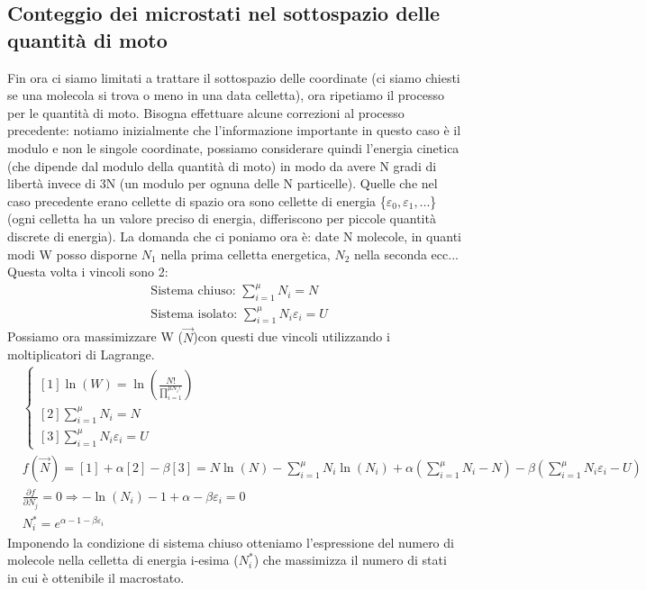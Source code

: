 \documentclass[
10pt, %
a4paper, %
oneside, %
headinclude,footinclude, %
BCOR5mm, %
]{scrartcl}
\begin{document}
\subsection{Conteggio dei microstati nel sottospazio delle quantità di moto}
Fin ora ci siamo limitati a trattare il sottospazio delle coordinate (ci siamo chiesti se una molecola si trova o meno in una data celletta), ora ripetiamo il processo per le quantità di moto. Bisogna effettuare alcune correzioni al processo precedente: notiamo inizialmente che l'informazione importante in questo caso è il modulo e non le singole coordinate, possiamo considerare quindi l'energia cinetica (che dipende dal modulo della quantità di moto) in modo da avere N gradi di libertà invece di 3N (un modulo per ognuna delle N particelle). Quelle che nel caso precedente erano cellette di spazio ora sono cellette di energia \{\(\varepsilon_0, \varepsilon_1,...\)\} (ogni celletta ha un valore preciso di energia, differiscono per piccole quantità discrete di energia). La domanda che ci poniamo ora è: date N molecole, in quanti modi W posso disporne \(N_1\) nella prima celletta energetica, \(N_2\) nella seconda ecc... Questa volta i vincoli sono 2:
\begin{align*}
	&\text{Sistema chiuso: }\sum_{i=1}^\mu N_i = N\\
	&\text{Sistema isolato: }\sum_{i=1}^\mu N_i\varepsilon_i = U
\end{align*}
Possiamo ora massimizzare W ($\vec{N}$)con questi due vincoli utilizzando i moltiplicatori di Lagrange. 
\begin{align*}
	&\begin{cases}
		[1]\ln(W)=\ln \left(\frac{N!}{\prod_{i=1}^{\mu N_i!}}\right)\\
		[2]\sum_{i=1}^\mu N_i = N\\
		[3]\sum_{i=1}^\mu N_i\varepsilon_i = U
	\end{cases}\\
	&f(\vec{N})=[1]+\alpha[2]-\beta[3] = N\ln(N)-\sum_{i=1}^\mu N_i\ln(N_i)+\alpha(\sum_{i=1}^\mu N_i - N)-\beta(\sum_{i=1}^\mu N_i\varepsilon_i - U)\\
	&\frac{\partial f}{\partial N_j} = 0 \Rightarrow -\ln(N_i)-1+\alpha-\beta\varepsilon_i = 0\\
	&N_i^* = e^{\alpha - 1-\beta\varepsilon_i}
\end{align*}
Imponendo la condizione di sistema chiuso otteniamo l'espressione del numero di molecole nella celletta di energia i-esima (\(N_i^*\)) che massimizza il numero di stati in cui è ottenibile il macrostato.
\end{document}
